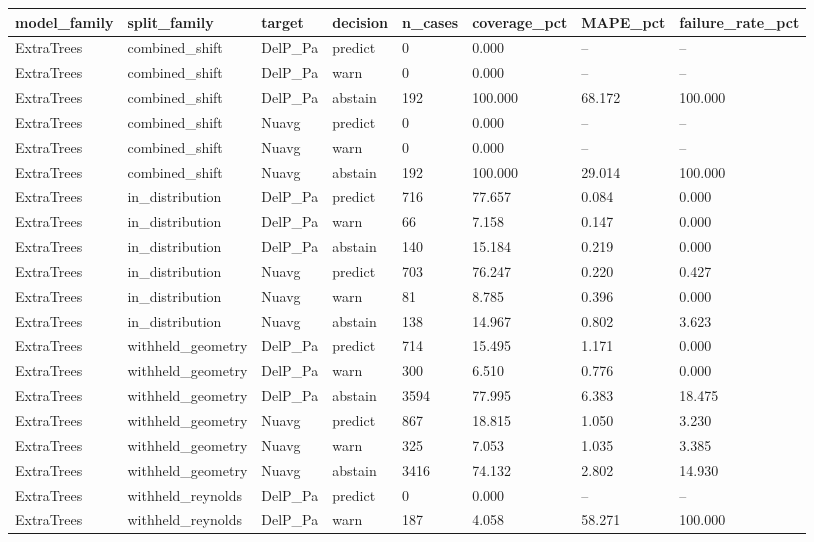 \begin{tabular}{llllllll}
\hline
model_family & split_family & target & decision & n_cases & coverage_pct & MAPE_pct & failure_rate_pct \\
\hline
ExtraTrees & combined_shift & DelP_Pa & predict & 0 & 0.000 & -- & -- \\
ExtraTrees & combined_shift & DelP_Pa & warn & 0 & 0.000 & -- & -- \\
ExtraTrees & combined_shift & DelP_Pa & abstain & 192 & 100.000 & 68.172 & 100.000 \\
ExtraTrees & combined_shift & Nuavg & predict & 0 & 0.000 & -- & -- \\
ExtraTrees & combined_shift & Nuavg & warn & 0 & 0.000 & -- & -- \\
ExtraTrees & combined_shift & Nuavg & abstain & 192 & 100.000 & 29.014 & 100.000 \\
ExtraTrees & in_distribution & DelP_Pa & predict & 716 & 77.657 & 0.084 & 0.000 \\
ExtraTrees & in_distribution & DelP_Pa & warn & 66 & 7.158 & 0.147 & 0.000 \\
ExtraTrees & in_distribution & DelP_Pa & abstain & 140 & 15.184 & 0.219 & 0.000 \\
ExtraTrees & in_distribution & Nuavg & predict & 703 & 76.247 & 0.220 & 0.427 \\
ExtraTrees & in_distribution & Nuavg & warn & 81 & 8.785 & 0.396 & 0.000 \\
ExtraTrees & in_distribution & Nuavg & abstain & 138 & 14.967 & 0.802 & 3.623 \\
ExtraTrees & withheld_geometry & DelP_Pa & predict & 714 & 15.495 & 1.171 & 0.000 \\
ExtraTrees & withheld_geometry & DelP_Pa & warn & 300 & 6.510 & 0.776 & 0.000 \\
ExtraTrees & withheld_geometry & DelP_Pa & abstain & 3594 & 77.995 & 6.383 & 18.475 \\
ExtraTrees & withheld_geometry & Nuavg & predict & 867 & 18.815 & 1.050 & 3.230 \\
ExtraTrees & withheld_geometry & Nuavg & warn & 325 & 7.053 & 1.035 & 3.385 \\
ExtraTrees & withheld_geometry & Nuavg & abstain & 3416 & 74.132 & 2.802 & 14.930 \\
ExtraTrees & withheld_reynolds & DelP_Pa & predict & 0 & 0.000 & -- & -- \\
ExtraTrees & withheld_reynolds & DelP_Pa & warn & 187 & 4.058 & 58.271 & 100.000 \\

\end{tabular}
